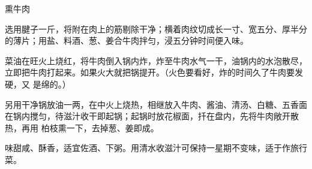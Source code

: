 \begin{recipe}{熏牛肉}

\ingredients


\preparation

\step 选用腱子一斤，将附在肉上的筋剔除干净；横着肉纹切成长一寸、宽五分、厚半分
的薄片；用盐、料酒、葱、姜合牛肉拌匀，浸五分钟时间便入味。

\step 菜油在旺火上烧红，将牛肉倒入锅内炸，炸至牛肉水气一干，油锅内的水泡散尽，
立即把牛肉打起来。如果火大就把锅提开。（火色要看好，炸的时间久了牛肉要发硬，又
是绵的。）

\step 另用干净锅放油一两，在中火上烧热，相继放入牛肉、酱油、清汤、白糖、五香面
在锅内搅匀，待滋汁收干即起锅；起锅时放花椒面，扦在盘内，先将牛肉敞开散热，再用
柏枝熏一下，去掉葱、姜即成。

\features

味甜咸、酥香，适宜佐酒、下粥。用清水收滋汁可保持一星期不变味，适于作旅行菜。

\end{recipe}

